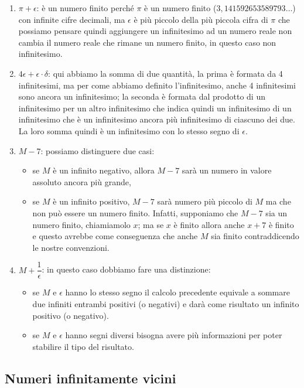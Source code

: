 \begin{esempio}
\begin{enumerate}
 \item \(\pi+\epsilon\): 
è un numero finito perché \(\pi\) è un numero 
finito (\(3,141592653589793\dots\)) con infinite cifre decimali, ma 
\(\epsilon\) è più piccolo della più piccola cifra di \(\pi\) che possiamo 
pensare quindi aggiungere un infinitesimo ad un numero reale non cambia il 
numero reale che rimane un numero finito, in questo caso non infinitesimo.
 \item  \(4\epsilon+\epsilon \cdot \delta\): 
qui abbiamo la somma di due quantità, 
la prima è formata da 4 infinitesimi, ma per come abbiamo definito 
l'infinitesimo, anche 4 infinitesimi sono ancora un infinitesimo; la 
seconda è formata dal prodotto di un infinitesimo per un altro infinitesimo 
che indica quindi un infinitesimo di un infinitesimo che è un infinitesimo 
ancora più infinitesimo di ciascuno dei due. La loro somma quindi è un 
infinitesimo con lo stesso segno di \(\epsilon\).
 \item \(M-7\):
possiamo distinguere due casi: 
 \begin{itemize} [noitemsep]
  \item se \(M\) è un infinito negativo, allora 
\(M-7\) sarà un numero in valore assoluto ancora più grande, 
 \item se \(M\) è un infinito positivo, \(M-7\) sarà numero più piccolo di 
\(M\) ma che non può essere un numero finito. 
Infatti, supponiamo che \(M-7\) sia un numero finito, chiamiamolo \(x\); ma 
se \(x\) è finito allora anche \(x+7\) è finito e questo avrebbe come 
conseguenza che anche \(M\) sia finito contraddicendo le nostre convenzioni.
 \end{itemize}
 \item \(M+\dfrac{1}{\epsilon}\):
 in questo caso dobbiamo fare una distinzione:
 \begin{itemize} [noitemsep]
  \item se \(M\) e \(\epsilon\) hanno lo stesso segno il calcolo precedente 
equivale a sommare due infiniti entrambi positivi (o negativi) e darà come 
risultato un infinito positivo (o negativo).
  \item se \(M\) e \(\epsilon\) hanno segni diversi bisogna avere più 
informazioni per poter stabilire il tipo del risultato.
 \end{itemize}

\end{enumerate}
\end{esempio}

\subsection{Numeri infinitamente vicini}
\label{subsec:insnum_infinitamentevicini}

